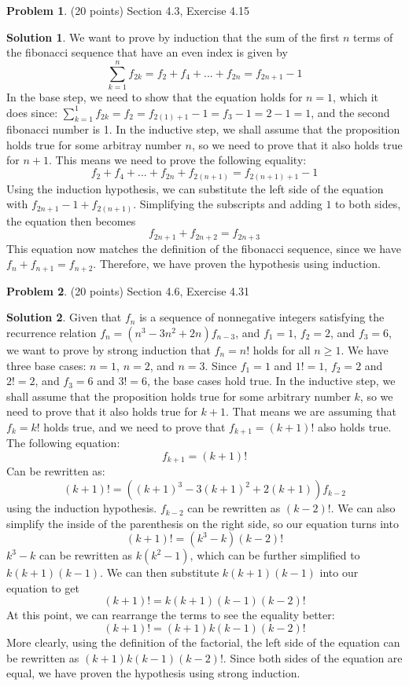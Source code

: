 \documentclass{article}
\theoremstyle{definition}
\newtheorem{problem}{Problem}
\newtheorem*{solution}{Solution}
\begin{document}
\newpage
\begin{problem} (20 points) Section 4.3, Exercise 4.15
\end{problem}
\begin{solution} 
We want to prove by induction that the sum of the first $n$ terms of the fibonacci sequence that have an even index is given by \[\sum_{k=1}^{n} f_{2k} = f_{2} + f_{4} + ... + f_{2n} = f_{2n+1} - 1\]
In the base step, we need to show that the equation holds for $n=1$, which it does since: $\sum_{k=1}^{1} f_{2k} = f_{2} = f_{2(1)+1} - 1 = f_{3} - 1 = 2 - 1 = 1$, and the second fibonacci number is 1.
In the inductive step, we shall assume that the proposition holds true for some arbitray number $n$, so we need to prove that it also holds true for $n+1$.
This means we need to prove the following equality: \[f_{2} + f_{4} + ... + f_{2n} + f_{2(n+1)} = f_{2(n+1)+1} - 1\]
Using the induction hypothesis, we can substitute the left side of the equation with $f_{2n+1} - 1 + f_{2(n+1)}$.
Simplifying the subscripts and adding $1$ to both sides, the equation then becomes \[f_{2n+1}+f_{2n+2} = f_{2n+3}\]
This equation now matches the definition of the fibonacci sequence, since we have $f_{n}+f_{n+1}=f_{n+2}$.
Therefore, we have proven the hypothesis using induction.

\end{solution}

\newpage
\begin{problem} (20 points) Section 4.6, Exercise 4.31
\end{problem}
\begin{solution} 
Given that $f_{n}$ is a sequence of nonnegative integers satisfying the recurrence relation $f_{n} = (n^{3} - 3n^{2} + 2n)f_{n-3}$, and $f_{1}=1$, $f_{2}=2$, and $f_{3}=6$, we want to prove by strong induction that $f_{n} = n!$ holds for all $n \ge 1$.
We have three base cases: $n=1$, $n=2$, and $n=3$.
Since $f_{1}=1$ and $1!=1$, $f_{2}=2$ and $2!=2$, and $f_{3}=6$ and $3!=6$, the base cases hold true.
In the inductive step, we shall assume that the proposition holds true for some arbitrary number $k$, so we need to prove that it also holds true for $k+1$.
That means we are assuming that $f_{k} = k!$ holds true, and we need to prove that $f_{k+1} = (k+1)!$ also holds true.
The following equation: $$f_{k+1}=(k+1)!$$
Can be rewritten as: $$(k+1)! = ((k+1)^{3}-3(k+1)^{2}+2(k+1))f_{k-2}$$
using the induction hypothesis. $f_{k-2}$ can be rewritten as $(k-2)!$.
We can also simplify the inside of the parenthesis on the right side, so our equation turns into $$(k+1)! = (k^{3} - k)(k-2)!$$
$k^{3} - k$ can be rewritten as $k(k^{2} - 1)$, which can be further simplified to $k(k+1)(k-1)$.
We can then substitute $k(k+1)(k-1)$ into our equation to get $$(k+1)! = k(k+1)(k-1)(k-2)!$$
At this point, we can rearrange the terms to see the equality better: $$(k+1)! = (k+1)k(k-1)(k-2)!$$
More clearly, using the definition of the factorial, the left side of the equation can be rewritten as $(k+1)k(k-1)(k-2)!$.
Since both sides of the equation are equal, we have proven the hypothesis using strong induction.
\end{solution}
\end{document}
